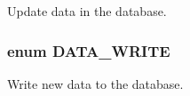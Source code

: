 Update data in the database. 

\hypertarget{class_8datahandler_8php_5d8b54a2eb4767a05a2e577c2db9193a}{
\subsubsection{\setlength{\rightskip}{0pt plus 5cm}enum {\bf DATA\_\-WRITE}}}
\label{class_8datahandler_8php_5d8b54a2eb4767a05a2e577c2db9193a}


Write new data to the database. 

